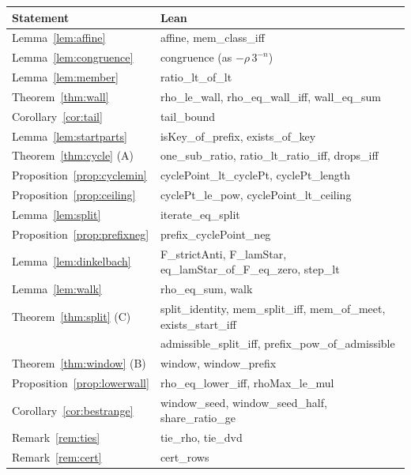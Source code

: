 \documentclass[10pt,a4paper,titlepage]{article}
\makeatletter
\newcommand{\lean}[1]{\textsf{#1}}
\newenvironment{herefloat}[1]
  {\par\addvspace{\intextsep}\noindent\begin{minipage}{\linewidth}%
   \def\@captype{#1}\centering}
  {\end{minipage}\par\nopagebreak\vspace{\intextsep}}
\theoremstyle{plain}
\theoremstyle{definition}
\theoremstyle{remark}
\makeatother
\begin{document}
\begin{herefloat}{table}\small
{\setlength{\extrarowheight}{1pt}\begin{tabular}{|l|l|}
\hline
Statement & Lean \\
\hline
Lemma~\ref{lem:affine} & \lean{affine}, \lean{mem\_class\_iff} \\
Lemma~\ref{lem:congruence} & \lean{congruence} (as $-\rho\,3^{-n}$) \\
Lemma~\ref{lem:member} & \lean{ratio\_lt\_of\_lt} \\
Theorem~\ref{thm:wall} & \lean{rho\_le\_wall}, \lean{rho\_eq\_wall\_iff}, \lean{wall\_eq\_sum} \\
Corollary~\ref{cor:tail} & \lean{tail\_bound} \\
Lemma~\ref{lem:startparts} & \lean{isKey\_of\_prefix}, \lean{exists\_of\_key} \\
Theorem~\ref{thm:cycle} (A) & \lean{one\_sub\_ratio}, \lean{ratio\_lt\_ratio\_iff}, \lean{drops\_iff} \\
Proposition~\ref{prop:cyclemin} & \lean{cyclePoint\_lt\_cyclePt}, \lean{cyclePt\_length} \\
Proposition~\ref{prop:ceiling} & \lean{cyclePt\_le\_pow}, \lean{cyclePoint\_lt\_ceiling} \\
Lemma~\ref{lem:split} & \lean{iterate\_eq\_split} \\
Proposition~\ref{prop:prefixneg} & \lean{prefix\_cyclePoint\_neg} \\
Lemma~\ref{lem:dinkelbach} & \lean{F\_strictAnti}, \lean{F\_lamStar}, \lean{eq\_lamStar\_of\_F\_eq\_zero}, \lean{step\_lt} \\
Lemma~\ref{lem:walk} & \lean{rho\_eq\_sum}, \lean{walk} \\
Theorem~\ref{thm:split} (C) & \lean{split\_identity}, \lean{mem\_split\_iff}, \lean{mem\_of\_meet}, \lean{exists\_start\_iff} \\
 & \lean{admissible\_split\_iff}, \lean{prefix\_pow\_of\_admissible} \\
Theorem~\ref{thm:window} (B) & \lean{window}, \lean{window\_prefix} \\
Proposition~\ref{prop:lowerwall} & \lean{rho\_eq\_lower\_iff}, \lean{rhoMax\_le\_mul} \\
Corollary~\ref{cor:bestrange} & \lean{window\_seed}, \lean{window\_seed\_half}, \lean{share\_ratio\_ge} \\
Remark~\ref{rem:ties} & \lean{tie\_rho}, \lean{tie\_dvd} \\
Remark~\ref{rem:cert} & \lean{cert\_rows} \\
\hline
\end{tabular}}
\caption{The statements of this paper and their Lean names in \texttt{best\_of\_order/}.}
\label{tab:lean}
\end{herefloat}
\end{document}
